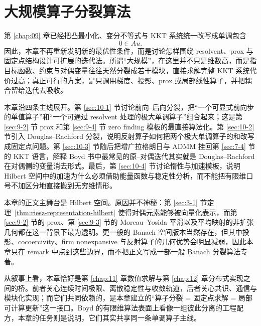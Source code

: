 \chapter{大规模算子分裂算法}

\label{chap:10}

第 \ref{chap:09} 章已经把凸最小化、变分不等式与 KKT 系统统一改写成单调包含
\[
0\in Au.
\]
因此，本章不再重新发明新的最优性条件，而是讨论怎样围绕 resolvent、prox 与固定点结构设计可扩展的迭代法。所谓“大规模”，在这里并不只是维数高，而是指目标函数、约束与对偶变量往往天然分裂成若干模块，直接求解完整 KKT 系统代价过高；真正可行的方案，是只调用梯度、投影、prox 或局部线性算子，并把耦合留给迭代去吸收。

本章沿四条主线展开。第 \ref{sec:10-1} 节讨论前向--后向分裂，把“一个可显式前向步的单值算子”和“一个可通过 resolvent 处理的极大单调算子”组合起来；这是第 \ref{sec:9-2} 节 prox 和第 \ref{sec:9-4} 节 zero finding 模板的最直接算法化。第 \ref{sec:10-2} 节引入 Douglas--Rachford 分裂，说明反射算子如何把两个极大单调算子的和改写成固定点问题。第 \ref{sec:10-3} 节随后把增广拉格朗日与 ADMM 挂回第 \ref{sec:7-4} 节的 KKT 语言，解释 Boyd 书中最常见的原--对偶迭代其实就是 Douglas--Rachford 在对偶侧的变量消去形式。最后，第 \ref{sec:10-4} 节讨论惰性与加速模板，说明 Hilbert 空间中的加速为什么必须借助能量函数与稳定性分析，而不能把有限维口号不加区分地直接搬到无穷维情形。

本章的正文主舞台是 Hilbert 空间。原因并不神秘：第 \ref{sec:3-1} 节定理~\ref{thm:riesz-representation-hilbert} 使得对偶元素能够被向量化表示，而第 \ref{sec:9-2} 节的 prox、第 \ref{sec:9-3} 节的 Moreau--Yosida 平滑以及平均映射的非扩张几何都在这一背景下最为透明。更一般的 Banach 空间版本当然存在，但其中投影、cocoercivity、firm nonexpansive 与反射算子的几何优势会明显减弱，因此本章只在 remark 中点到这些边界，而不把正文写成一部一般 Banach 分裂算法专著。

从叙事上看，本章恰好是第 \ref{chap:11} 章数值求解与第 \ref{chap:12} 章分布式实现之间的桥。前者关心连续时间极限、离散稳定性与收敛轨道，后者关心共识、通信与模块化实现；而它们共同依赖的，是本章建立的“算子分裂 = 固定点求解 = 局部可计算更新”这一接口。Boyd 的有限维算法表面上看像一组彼此分离的工程配方，本章的任务则是说明，它们其实共享同一条单调算子主线。








